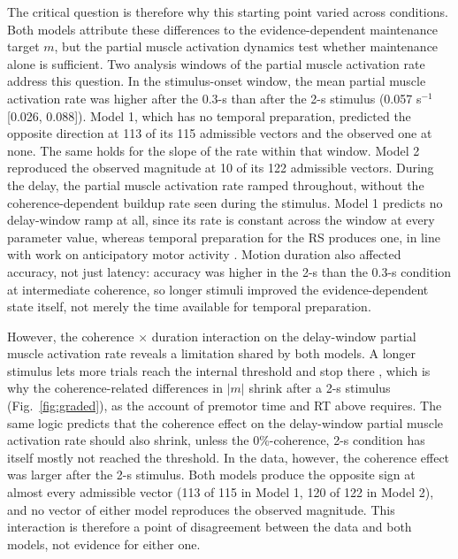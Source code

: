 \documentclass[a4paper,11pt]{article}
\theoremstyle{definition}
\newcommand{\1}{\mathbbm{1}}
\begin{document}
The critical question is therefore why this starting point varied across conditions. Both models attribute these differences to the evidence-dependent maintenance target $m$, but the partial muscle activation dynamics test whether maintenance alone is sufficient. Two analysis windows of the partial muscle activation rate address this question. In the stimulus-onset window, the mean partial muscle activation rate was higher after the 0.3-s than after the 2-s stimulus (0.057 s$^{-1}$ [0.026, 0.088]). Model 1, which has no temporal preparation, predicted the opposite direction at 113 of its 115 admissible vectors and the observed one at none. The same holds for the slope of the rate within that window. Model 2 reproduced the observed magnitude at 10 of its 122 admissible vectors. During the delay, the partial muscle activation rate ramped throughout, without the coherence-dependent buildup rate seen during the stimulus. Model 1 predicts no delay-window ramp at all, since its rate is constant across the window at every parameter value, whereas temporal preparation for the RS produces one, in line with work on anticipatory motor activity \parencites{burleExcitatoryInhibitoryMotor2010}{heidemanTemporalAlignmentAnticipatory2018}{ramayyaHumanResponseTimes2025}. Motion duration also affected accuracy, not just latency: accuracy was higher in the 2-s than the 0.3-s condition at intermediate coherence, so longer stimuli improved the evidence-dependent state itself, not merely the time available for temporal preparation.

However, the coherence $\times$ duration interaction on the delay-window partial muscle activation rate reveals a limitation shared by both models. A longer stimulus lets more trials reach the internal threshold and stop there \parencites{mazurekRoleNeuralIntegrators2003}{kianiBoundedIntegrationParietal2008}, which is why the coherence-related differences in $|m|$ shrink after a 2-s stimulus (Fig.~\ref{fig:graded}), as the account of premotor time and RT above requires. The same logic predicts that the coherence effect on the delay-window partial muscle activation rate should also shrink, unless the 0\%-coherence, 2-s condition has itself mostly not reached the threshold. In the data, however, the coherence effect was larger after the 2-s stimulus. Both models produce the opposite sign at almost every admissible vector (113 of 115 in Model 1, 120 of 122 in Model 2), and no vector of either model reproduces the observed magnitude. This interaction is therefore a point of disagreement between the data and both models, not evidence for either one.
\end{document}
